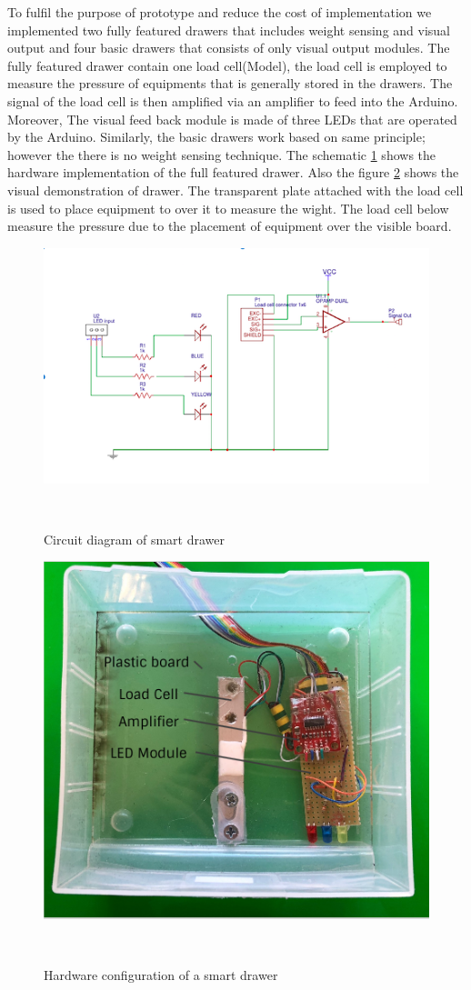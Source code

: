 To fulfil  the purpose of prototype and reduce the cost of implementation we implemented two fully featured drawers that includes weight sensing and visual output and four basic drawers that consists of only visual output modules.
The fully featured drawer contain one load cell(Model), the load cell is employed to measure the pressure of equipments that is generally stored in the drawers. The signal of the load cell is then amplified via an amplifier to feed into the Arduino. Moreover, The visual feed back module is made of three LEDs that are operated by the Arduino. Similarly, the basic drawers work based on same principle; however the there is no weight sensing technique. The schematic  \ref{fig:example_circuit}  shows the hardware implementation of the full featured drawer. Also the figure  \ref{fig:example_drawer} shows the visual demonstration of drawer. The transparent plate attached with the load cell is used to place equipment to over it to measure the wight. The load cell below measure the pressure due to the placement of equipment over the visible board. 
%
\begin{figure}
	\includegraphics[width=1\columnwidth]{figures/drawer_circuit}
	\caption{Circuit diagram of smart drawer}~\label{fig:example_circuit}
\end{figure}
\begin{figure}
	\includegraphics[width=1\columnwidth]{figures/drawer.png}
	\caption{Hardware configuration of a smart drawer}~\label{fig:example_drawer}
\end{figure}
%
\\